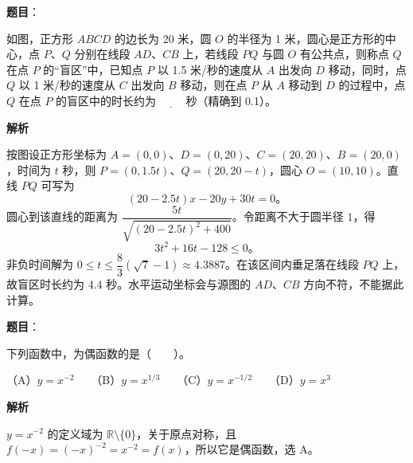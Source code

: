 \begin{answer}

\textbf{题目}：

如图，正方形 $ABCD$ 的边长为 20 米，圆 $O$ 的半径为 1 米，圆心是正方形的中心，点 $P\text{、}Q$ 分别在线段 $AD\text{、}CB$ 上，若线段 $PQ$ 与圆 $O$ 有公共点，则称点 $Q$ 在点 $P$ 的“盲区”中，已知点 $P$ 以 1.5 米/秒的速度从 $A$ 出发向 $D$ 移动，同时，点 $Q$ 以 1 米/秒的速度从 $C$ 出发向 $B$ 移动，则在点 $P$ 从 $A$ 移动到 $D$ 的过程中，点 $Q$ 在点 $P$ 的盲区中的时长约为 $\underline{\qquad}$ 秒（精确到 0.1）。
\nopagebreak[4]
\begin{center}\end{center}
\nopagebreak[4]
\textbf{解析}
\nopagebreak[4]
\begin{center}\end{center}
\nopagebreak[4]
按图设正方形坐标为 $A=(0,0)$、$D=(0,20)$、$C=(20,20)$、$B=(20,0)$，时间为 $t$ 秒，则 $P=(0,1.5t)$、$Q=(20,20-t)$，圆心 $O=(10,10)$。直线 $PQ$ 可写为
\nopagebreak[4]
\[
(20-2.5t)x-20y+30t=0\text{。}
\]
圆心到该直线的距离为 $\dfrac{5t}{\sqrt{(20-2.5t)^2+400}}$。令距离不大于圆半径 $1$，得
\nopagebreak[4]
\[
3t^2+16t-128\leq0\text{。}
\]
非负时间解为 $0\leq t\leq\dfrac83(\sqrt7-1)\approx4.3887$。在该区间内垂足落在线段 $PQ$ 上，故盲区时长约为 $4.4$ 秒。水平运动坐标会与源图的 $AD$、$CB$ 方向不符，不能据此计算。


\end{answer}
\begin{answer}

\textbf{题目}：

下列函数中，为偶函数的是\mbox{（　　）}。

（A）$y=x^{-2}$　　（B）$y=x^{1/3}$　　（C）$y=x^{-1/2}$　　（D）$y=x^3$

\textbf{解析}

$y=x^{-2}$ 的定义域为 $\mathbb R\setminus\{0\}$，关于原点对称，且 $f(-x)=(-x)^{-2}=x^{-2}=f(x)$，所以它是偶函数，选 A。


\end{answer}

